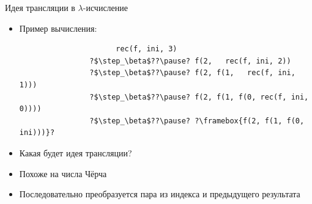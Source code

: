    \begin{frame}[fragile]{Идея трансляции в $\lambda$-исчисление}
        \begin{itemize}
            \item Пример вычисления:
            \begin{verbatim}
                      rec(f, ini, 3)
                ?$\step_\beta$??\pause? f(2,   rec(f, ini, 2))
                ?$\step_\beta$??\pause? f(2, f(1,   rec(f, ini, 1)))
                ?$\step_\beta$??\pause? f(2, f(1, f(0, rec(f, ini, 0))))
                ?$\step_\beta$??\pause? ?\framebox{f(2, f(1, f(0, ini)))}?
            \end{verbatim}
            \item[\todo] Какая будет идея трансляции?
            \item[\answer] \pause Похоже на числа Чёрча
            \item[\answer] Последовательно преобразуется пара из индекса и предыдущего результата
        \end{itemize}
    \end{frame}

